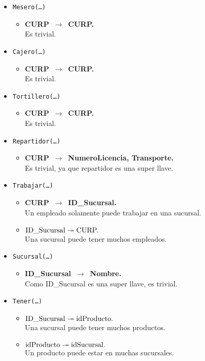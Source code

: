 \documentclass{article}
\newcommand{\flecha}{$\,\to\,$ }
\begin{document}
\begin{itemize}
\item \texttt{Mesero(\ldots)}
	\begin{itemize}
		\item \textbf{CURP \flecha CURP.}\\
		Es trivial.
	\end{itemize}

\item \texttt{Cajero(\ldots)}
	\begin{itemize}
		\item \textbf{CURP \flecha CURP.}\\
		Es trivial.
	\end{itemize}

\item \texttt{Tortillero(\ldots)}
	\begin{itemize}
		\item \textbf{CURP \flecha CURP.}\\
		Es trivial.
	\end{itemize}

\item \texttt{Repartidor(\ldots)}
	\begin{itemize}
		\item \textbf{CURP \flecha NumeroLicencia, Transporte.}\\
		Es trivial, ya que repartidor es una super llave.
	\end{itemize}

\item \texttt{Trabajar(\ldots)}
	\begin{itemize}
		\item \textbf{CURP \flecha ID\_Sucursal.}\\
		Un empleado solamente puede trabajar en una sucursal.
		\item \textbf{$\hbox{ID\_Sucursal} \twoheadrightarrow \hbox{CURP.}$}\\
		Una sucursal puede tener muchos empleados.
	\end{itemize}

\item \texttt{Sucursal(\ldots)}
	\begin{itemize}
		\item \textbf{ID\_Sucursal \flecha Nombre.}\\
		Como ID\_Sucursal es una super llave, es trivial.
	\end{itemize}

\item \texttt{Tener(\ldots)}
	\begin{itemize}
		\item \textbf{$\hbox{ID\_Sucursal} \twoheadrightarrow \hbox{idProducto.}$}\\
		Una sucursal puede tener muchos productos.
		\item \textbf{$\hbox{idProducto} \twoheadrightarrow \hbox{idSucursal.}$}\\
		Un producto puede estar en muchas sucursales.
	\end{itemize}	


\end{itemize}
\end{document}
